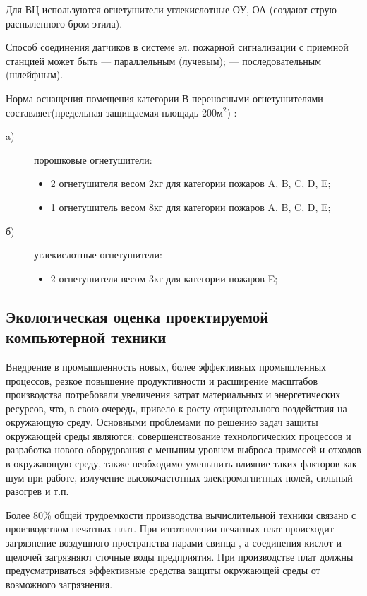Для ВЦ используются огнетушители углекислотные ОУ, ОА (создают струю распыленного бром этила).

Способ соединения датчиков в системе эл. пожарной сигнализации с приемной станцией может быть — параллельным (лучевым);
— последовательным (шлейфным).

Норма оснащения помещения категории В  переносными огнетушителями составляет(предельная защищаемая площадь 200м$^2$) 
\cite{bjd421}:
\begin{description}

	\item[a)] порошковые огнетушители:
		\begin{itemize}
		\item 2 огнетушителя весом 2кг для категории пожаров A, B, C, D, E;
		\item 1 огнетушитель весом 8кг для категории пожаров A, B, C, D, E;
		\end{itemize}
	\item[б)] 	углекислотные огнетушители:
		\begin{itemize}
		\item 2 огнетушителя весом 3кг для категории пожаров E;
		\end{itemize}

\end{description}

\subsection{Экологическая оценка проектируемой компьютерной техники}
Внедрение в промышленность новых, более эффективных промышленных процессов, резкое повышение продуктивности и расширение
масштабов производства потребовали увеличения затрат материальных и энергетических ресурсов, что, в свою очередь,
привело к росту отрицательного воздействия на окружающую среду. Основными проблемами по решению задач защиты окружающей
среды являются: совершенствование технологических процессов и разработка нового оборудования с меньшим уровнем выброса
примесей и отходов в окружающую среду, также необходимо уменьшить влияние таких факторов как шум при работе, излучение
высокочастотных электромагнитных полей, сильный разогрев и т.п.

Более 80\% общей трудоемкости производства вычислительной техники связано с производством печатных плат.
При изготовлении печатных плат происходит загрязнение воздушного пространства парами свинца \cite{bjd43}, а соединения кислот и
щелочей загрязняют сточные воды предприятия. При производстве плат должны предусматриваться эффективные средства
защиты окружающей среды от возможного загрязнения.

